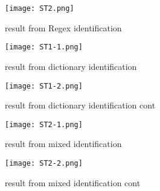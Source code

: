 \documentclass[sigconf]{acmart}
\begin{document}
\begin{figure}[htp]
    \centering
    \texttt{[image: ST2.png]}
    \caption{result from Regex identification}
    \label{fig:galaxy}
\end{figure}
\begin{figure}[htp]
    \centering
    \texttt{[image: ST1-1.png]}
    \caption{result from dictionary identification}
    \label{fig:galaxy}
\end{figure}
\begin{figure}[htp]
    \centering
    \texttt{[image: ST1-2.png]}
    \caption{result from dictionary identification cont}
    \label{fig:galaxy}
\end{figure}
\begin{figure}[htp]
    \centering
    \texttt{[image: ST2-1.png]}
    \caption{result from mixed identification}
    \label{fig:galaxy}
\end{figure}
\begin{figure}[htp]
    \centering
    \texttt{[image: ST2-2.png]}
    \caption{result from mixed identification cont}
    \label{fig:galaxy}
\end{figure}
\end{document}
